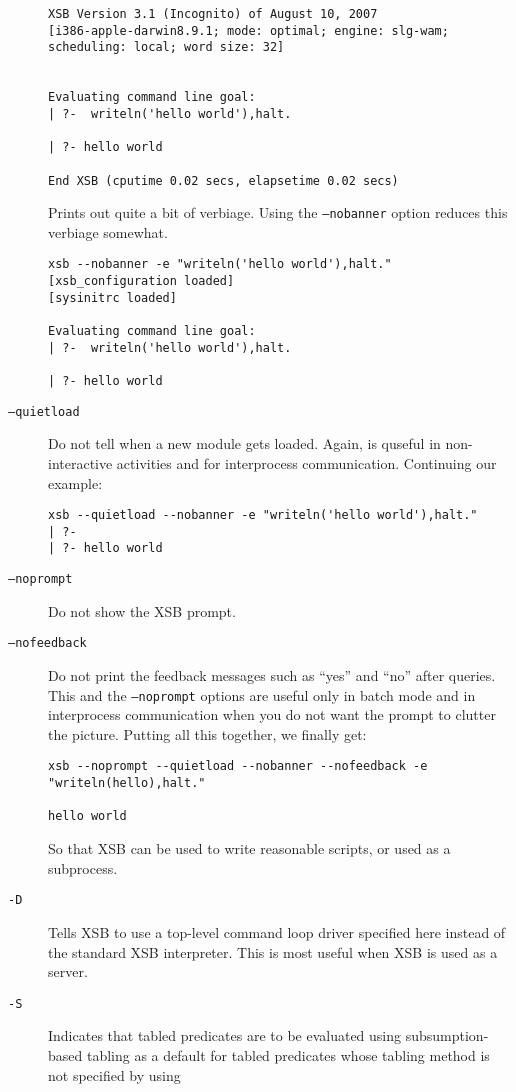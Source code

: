 \begin{description}
\begin{verbatim}
XSB Version 3.1 (Incognito) of August 10, 2007
[i386-apple-darwin8.9.1; mode: optimal; engine: slg-wam; scheduling: local; word size: 32]


Evaluating command line goal:  
| ?-  writeln('hello world'),halt.

| ?- hello world

End XSB (cputime 0.02 secs, elapsetime 0.02 secs)
\end{verbatim}
Prints out quite a bit of verbiage.  Using the {\tt --nobanner} option
reduces this verbiage somewhat.
\begin{verbatim}
xsb --nobanner -e "writeln('hello world'),halt."
[xsb_configuration loaded]
[sysinitrc loaded]

Evaluating command line goal:  
| ?-  writeln('hello world'),halt.

| ?- hello world
\end{verbatim}
%
 \item[{\tt --quietload}] Do not tell when a new module gets
    loaded. Again, is quseful in non-interactive activities and for
    interprocess communication.  Continuing our example:
\begin{verbatim}
xsb --quietload --nobanner -e "writeln('hello world'),halt."
| ?- 
| ?- hello world
\end{verbatim}
%
  \item[{\tt --noprompt}] Do not show the XSB prompt.
%
\item[{\tt --nofeedback}] Do not print the feedback messages such as
  ``yes'' and ``no'' after queries.
    This and the \texttt{--noprompt} options are useful only in batch
    mode and in interprocess communication when you do not want the prompt
    to clutter the picture.  Putting all this together, we finally get: 
\begin{verbatim}
xsb --noprompt --quietload --nobanner --nofeedback -e "writeln(hello),halt."

hello world
\end{verbatim}
So that XSB can be used to write reasonable scripts, or used as a subprocess.
\item[{\tt -D}] Tells XSB to use a top-level command loop driver specified
  here instead of the standard XSB interpreter. This is most useful when
 XSB is used as a server.
\item[{\tt -S}] Indicates that tabled predicates are to be evaluated
  using subsumption-based tabling as a default for tabled predicates
  whose tabling method is not specified by using


\end{description}
